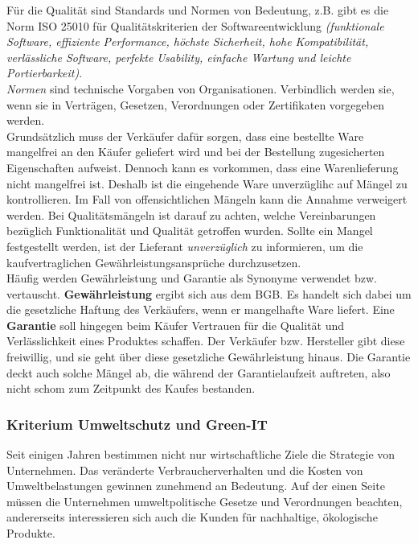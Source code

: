 \documentclass[a4paper, 12pt]{report}
\begin{document}
Für die Qualität sind Standards und Normen von Bedeutung, z.B. gibt es die Norm
ISO 25010 für Qualitätskriterien der Softwareentwicklung \emph{(funktionale
Software, effiziente Performance, höchste Sicherheit, hohe Kompatibilität,
verlässliche Software, perfekte Usability, einfache Wartung und leichte
Portierbarkeit)}. \\

\emph{Normen} sind technische Vorgaben von Organisationen. Verbindlich werden
sie, wenn sie in Verträgen, Gesetzen, Verordnungen oder Zertifikaten vorgegeben
werden. \\

Grundsätzlich muss der Verkäufer dafür sorgen, dass eine bestellte Ware
mangelfrei an den Käufer geliefert wird und bei der Bestellung zugesicherten
Eigenschaften aufweist. Dennoch kann es vorkommen, dass eine Warenlieferung
nicht mangelfrei ist. Deshalb ist die eingehende Ware unverzüglihc auf Mängel
zu kontrollieren. Im Fall von offensichtlichen Mängeln kann die Annahme
verweigert werden. Bei Qualitätsmängeln ist darauf zu achten, welche
Vereinbarungen bezüglich Funktionalität und Qualität getroffen wurden. Sollte
ein Mangel festgestellt werden, ist der Lieferant \emph{unverzüglich} zu
informieren, um die kaufvertraglichen Gewährleistungsansprüche durchzusetzen. \\

Häufig werden Gewährleistung und Garantie als Synonyme verwendet bzw.
vertauscht. \textbf{Gewährleistung} ergibt sich aus dem BGB. Es handelt sich
dabei um die gesetzliche Haftung des Verkäufers, wenn er mangelhafte Ware
liefert. Eine \textbf{Garantie} soll hingegen beim Käufer Vertrauen für die
Qualität und Verlässlichkeit eines Produktes schaffen. Der Verkäufer bzw.
Hersteller gibt diese freiwillig, und sie geht über diese gesetzliche
Gewährleistung hinaus. Die Garantie deckt auch solche Mängel ab, die während der
Garantielaufzeit auftreten, also nicht schom zum Zeitpunkt des Kaufes bestanden.

\subsubsection{Kriterium Umweltschutz und Green-IT}

Seit einigen Jahren bestimmen nicht nur wirtschaftliche Ziele die Strategie von
Unternehmen. Das veränderte Verbraucherverhalten und die Kosten von
Umweltbelastungen gewinnen zunehmend an Bedeutung. Auf der einen Seite müssen
die Unternehmen umweltpolitische Gesetze und Verordnungen beachten, andererseits
interessieren sich auch die Kunden für nachhaltige, ökologische Produkte. \\
\end{document}
